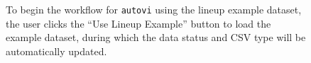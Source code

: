 \documentclass[
doublespace,
  times]{anzsauth}
\begin{document}
\begin{figure}


\caption{\label{fig-autovi-web-workflow-example1}To begin the workflow
for \texttt{autovi} using the lineup example dataset, the user clicks
the ``Use Lineup Example'' button to load the example dataset, during
which the data status and CSV type will be automatically updated.}

\end{figure}%
\end{document}
